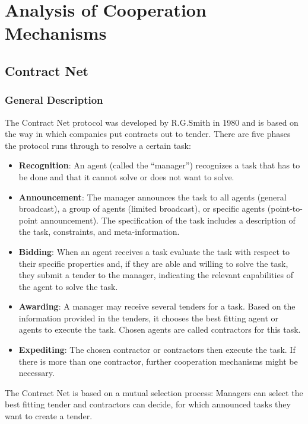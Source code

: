\section{Analysis of Cooperation Mechanisms}
\label{sec:allCoop}

\subsection{Contract Net}

\subsubsection{General Description}

The Contract Net protocol was developed by R.G.Smith in 1980 \cite{Smith:1980:CNP:1311969.1312903} and is based on the way in which companies put contracts out to tender. There are five phases the protocol runs through to resolve a certain task:

\begin{itemize}
	\item \textbf{Recognition}: An agent (called the ``manager'') recognizes a task that has to be done and that it cannot solve or does not want to solve.
	\item \textbf{Announcement}: The manager announces the task to all agents (general broadcast), a group of agents (limited broadcast), or specific agents (point-to-point announcement). The specification of the task includes a description of the task, constraints, and meta-information.
	\item \textbf{Bidding}: When an agent receives a task evaluate the task with respect to their specific properties and, if they are able and willing to solve the task, they submit a tender to the manager, indicating the relevant capabilities of the agent to solve the task.
	\item \textbf{Awarding}: A manager may receive several tenders for a task. Based on the information provided in the tenders, it chooses the best fitting agent or agents to execute the task. Chosen agents are called contractors for this task.
	\item \textbf{Expediting}: The chosen contractor or contractors then execute the task. If there is more than one contractor, further cooperation mechanisms might be necessary.
\end{itemize}

The Contract Net is based on a mutual selection process: Managers can select the best fitting tender and contractors can decide, for which announced tasks they want to create a tender.  

